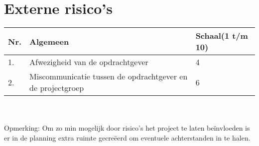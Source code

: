 \section{Externe risico's} \label{sec:Externe risicos}

    \begin{tabular}{ | l | l | l | }
    	\hline
    	Nr. & Algemeen & Schaal(1 t/m 10) \\ \hline
    	1.	& Afwezigheid van de opdrachtgever & 4 \\ \hline
    	2.  & Miscommunicatie tussen de opdrachtgever en de projectgroep & 6 \\ \hline
  	\end{tabular}
\\
\\
Opmerking: Om zo min mogelijk door risico’s het project te laten beïnvloeden is er in de planning extra ruimte gecreëerd om eventuele achterstanden in te halen.